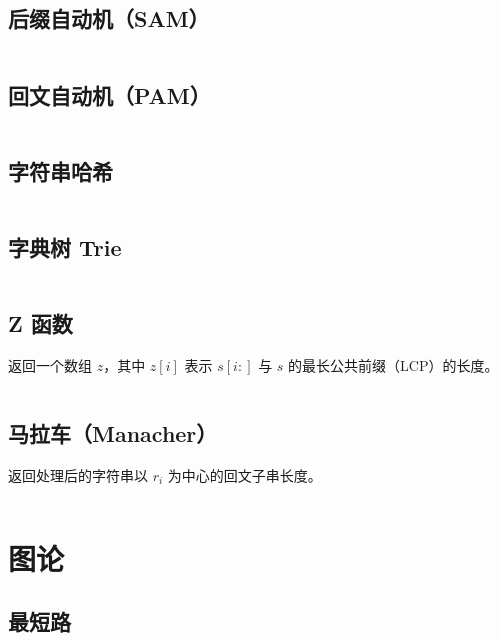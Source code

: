 \documentclass[a4paper, twoside]{article}
\begin{document}
\subsection{后缀自动机（SAM）}
\inputminted{cpp}{../src/字符串/后缀自动机（SAM）.cpp}

\subsection{回文自动机（PAM）}
\inputminted{cpp}{../src/字符串/回文自动机（PAM）.cpp}

\subsection{字符串哈希}
\inputminted{cpp}{../src/字符串/字符串哈希.cpp}


\subsection{字典树 Trie}
\inputminted{cpp}{../src/字符串/字典树Trie.cpp}

\subsection{Z 函数}
返回一个数组 $z$，其中 $z[i]$ 表示 $s[i:]$ 与 $s$ 的最长公共前缀（LCP）的长度。
\inputminted{cpp}{../src/字符串/Z函数.cpp}

\subsection{马拉车（Manacher）}
返回处理后的字符串以 $r_i$ 为中心的回文子串长度。
\inputminted{cpp}{../src/字符串/Manacher.cpp}


\newpage
\section{图论}
\subsection{最短路}
\end{document}

